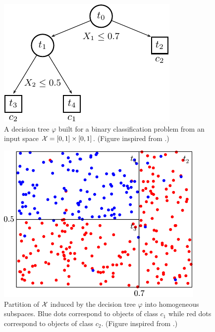 \begin{figure}
    \centering
    \includegraphics[scale=1.0]{figures/ch3_tree.pdf}
    \caption{A decision tree $\varphi$ built for a binary classification
             problem from an input space ${\cal X}=[0,1]\times[0,1]$.
             (Figure inspired from \citet{breiman:1984}.)}
    \label{fig:3:tree}
\end{figure}

\begin{figure}
    \centering
    \includegraphics[width=0.9\textwidth]{figures/ch3_partition.pdf}
    \caption{Partition of ${\cal X}$ induced by the decision tree $\varphi$ into homogeneous subspaces.
             Blue dots correspond to objects of class $c_1$ while red dots correspond
             to objects of class $c_2$. (Figure inspired from \citet{breiman:1984}.)}
    \label{fig:3:partition}
\end{figure}

